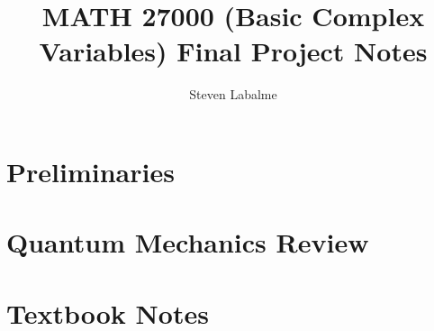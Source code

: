 \documentclass[titlepage]{article}
\title{MATH 27000 (Basic Complex Variables) Final Project Notes}
\author{Steven Labalme}
\begin{document}
\maketitle



\tableofcontents
\newpage



\pagestyle{empty}
\part{Preliminaries}
\newpage

\pagestyle{main}
\renewcommand{\leftmark}{Final Project Proposal Form}
\renewcommand{\proofname}{Answer}

\renewcommand{\proofname}{Proof}
\newpage

\renewcommand{\leftmark}{Proposal Feedback}

\newpage


\pagestyle{empty}
\part{Quantum Mechanics Review}
\newpage

\pagestyle{main}
\renewcommand{\leftmark}{CHEM 26100 Notes}

\newpage

\renewcommand{\leftmark}{PHYS 23410 Notes}

\newpage


\pagestyle{empty}
\part{Textbook Notes}
\newpage

\pagestyle{main}
\renewcommand{\leftmark}{\firstmark}
\renewcommand{\sectionmark}[1]{\markboth{Chapter \thesection\ (#1)}{}}
\renewcommand{\subsectionmark}[1]{}

\newpage


\newpage


\newpage


\newpage


\newpage


\newpage


\newpage


\newpage
\end{document}
